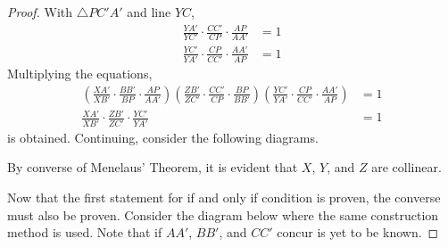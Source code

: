 \documentclass[../../main.tex]{subfiles}
\begin{document}
\begin{proof}
With $\triangle{PC'A'}$ and line $YC$,
\begin{align*}
    \frac{YA'}{YC'} \cdot \frac{CC'}{CP}
    \cdot \frac{AP}{AA'}
    &= 1 \\
    \frac{YC'}{YA'} \cdot \frac{CP}{CC'}
    \cdot \frac{AA'}{AP}
    &= 1
\end{align*}
Multiplying the equations,
\begin{align*}
    \left( \frac{XA'}{XB'} \cdot \frac{BB'}{BP}
        \cdot \frac{AP}{AA'} \right)
    \left( \frac{ZB'}{ZC'} \cdot \frac{CC'}{CP}
        \cdot \frac{BP}{BB'} \right)
    \left( \frac{YC'}{YA'} \cdot \frac{CP}{CC'}
        \cdot \frac{AA'}{AP} \right)
    &= 1 \\
    \frac{XA'}{XB'} \cdot \frac{ZB'}{ZC'} \cdot
    \frac{YC'}{YA'}
    &= 1
\end{align*}
is obtained. Continuing, consider the following diagrams.

\begin{center}
\end{center}

By converse of Menelaus' Theorem, it is evident that $X$, $Y$, and
$Z$ are collinear.

Now that the first statement for if and only if condition is proven,
the converse must also be proven. Consider the diagram below where the
same construction method is used. Note that if $AA'$, $BB'$, and $CC'$
concur is yet to be known.


\end{proof}
\end{document}
